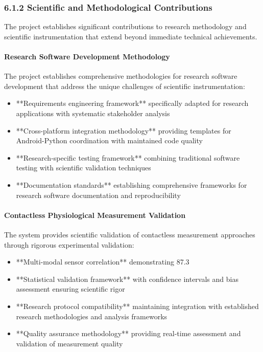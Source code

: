 \documentclass[12pt,a4paper]{article}
\begin{document}
\subsubsection{6.1.2 Scientific and Methodological Contributions}

The project establishes significant contributions to research methodology and scientific instrumentation that extend
beyond immediate technical achievements.

\paragraph{Research Software Development Methodology}

The project establishes comprehensive methodologies for research software development that address the unique challenges
of scientific instrumentation:

\begin{itemize}
\item **Requirements engineering framework** specifically adapted for research applications with systematic stakeholder
  analysis
\item **Cross-platform integration methodology** providing templates for Android-Python coordination with maintained code
  quality
\item **Research-specific testing framework** combining traditional software testing with scientific validation techniques
\item **Documentation standards** establishing comprehensive frameworks for research software documentation and
  reproducibility

\end{itemize}
\paragraph{Contactless Physiological Measurement Validation}

The system provides scientific validation of contactless measurement approaches through rigorous experimental
validation:

\begin{itemize}
\item **Multi-modal sensor correlation** demonstrating 87.3%
\item **Statistical validation framework** with confidence intervals and bias assessment ensuring scientific rigor
\item **Research protocol compatibility** maintaining integration with established research methodologies and analysis
  frameworks
\item **Quality assurance methodology** providing real-time assessment and validation of measurement quality

\end{itemize}
\end{document}
